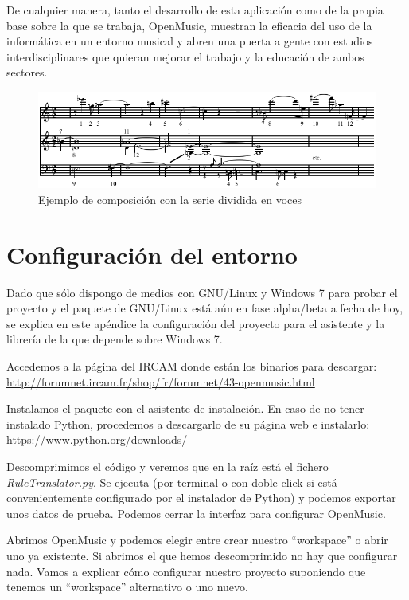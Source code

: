\documentclass[a4paper,openany,oneside,12pt]{book}
\begin{document}
De cualquier manera, tanto el desarrollo de esta aplicación como de la propia base sobre la que se trabaja, OpenMusic, muestran la eficacia del uso de la informática en un entorno musical y abren una puerta a gente con estudios interdisciplinares que quieran mejorar el trabajo y la educación de ambos sectores.

\begin{figure}
\centering
\includegraphics[width=\textwidth]{img/Schoenberg_-_Wind_Quintet_opening.png}
\caption{Ejemplo de composición con la serie dividida en voces\cite{wiki:twelvetonetechnique}} \label{fig:twelvetoneexample}
\end{figure}


\nocite{*}
\cleardoublepage
{}



\appendix
\chapter{Configuración del entorno}\label{aped.A}
Dado que sólo dispongo de medios con GNU/Linux y Windows 7 para probar el proyecto y el paquete de GNU/Linux está aún en fase alpha/beta a fecha de hoy, se explica en este apéndice la configuración del proyecto para el asistente y la librería de la que depende sobre Windows 7.

Accedemos a la página del IRCAM donde están los binarios para descargar: \url{http://forumnet.ircam.fr/shop/fr/forumnet/43-openmusic.html}

Instalamos el paquete con el asistente de instalación. En caso de no tener instalado Python, procedemos a descargarlo de su página web e instalarlo: \url{https://www.python.org/downloads/}

Descomprimimos el código y veremos que en la raíz está el fichero \emph{RuleTranslator.py}. Se ejecuta (por terminal o con doble click si está convenientemente configurado por el instalador de Python) y podemos exportar unos datos de prueba. Podemos cerrar la interfaz para configurar OpenMusic.

Abrimos OpenMusic y podemos elegir entre crear nuestro ``workspace'' o abrir uno ya existente. Si abrimos el que hemos descomprimido no hay que configurar nada. Vamos a explicar cómo configurar nuestro proyecto suponiendo que tenemos un ``workspace'' alternativo o uno nuevo.
\end{document}
